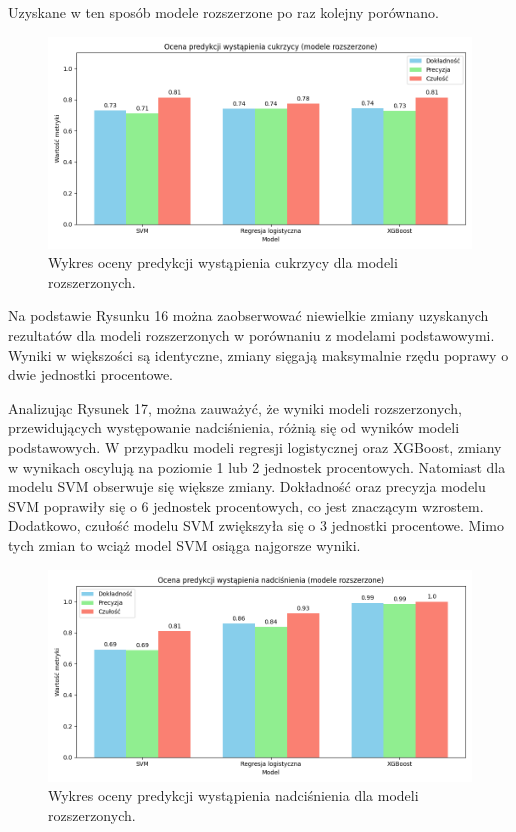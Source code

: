 \documentclass[onecolumn,12pt]{article}
\begin{document}
\noindent
Uzyskane w ten sposób modele rozszerzone po raz kolejny porównano.

\begin{figure}[H]
    \centering
    \includegraphics[width=0.90\linewidth]{raport/graphs/cukrzyca_po.png}
    \captionsetup{justification=centering}
    \caption{Wykres oceny predykcji wystąpienia cukrzycy dla modeli rozszerzonych.}
\end{figure}

\noindent
Na podstawie Rysunku 16 można zaobserwować niewielkie zmiany uzyskanych rezultatów dla modeli rozszerzonych w porównaniu z modelami podstawowymi. Wyniki w większości są identyczne, zmiany sięgają maksymalnie rzędu poprawy o dwie jednostki procentowe.

\vspace{8pt}
\noindent
Analizując Rysunek 17, można zauważyć, że wyniki modeli rozszerzonych, przewidujących występowanie nadciśnienia, różnią się od wyników modeli podstawowych. W przypadku modeli regresji logistycznej oraz XGBoost, zmiany w wynikach oscylują na poziomie 1 lub 2 jednostek procentowych. Natomiast dla modelu SVM obserwuje się większe zmiany. Dokładność oraz precyzja modelu SVM poprawiły się o 6 jednostek procentowych, co jest znaczącym wzrostem. Dodatkowo, czułość modelu SVM zwiększyła się o 3 jednostki procentowe. Mimo tych zmian to wciąż model SVM osiąga najgorsze wyniki.

\begin{figure}[H]
    \centering
    \includegraphics[width=0.90\linewidth]{raport/graphs/nadcisnienie_po.png}
    \captionsetup{justification=centering}
    \caption{Wykres oceny predykcji wystąpienia nadciśnienia dla modeli rozszerzonych.}
\end{figure}
\end{document}
